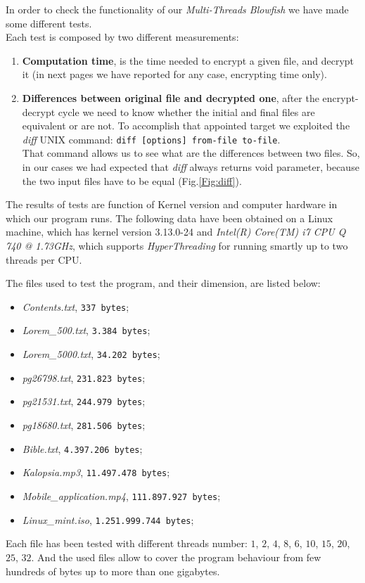 In order to check the functionality of our \textit{Multi-Threads Blowfish} we have made some different tests.\\
Each test is composed by two different measurements:
\begin{enumerate}
\item \textbf{Computation time}, is the time needed to encrypt a given file, and decrypt it (in next pages we have reported for any case, encrypting time only).
\item \textbf{Differences between original file and decrypted one}, after the encrypt-decrypt cycle we need to know whether the initial and final files are equivalent or are not. To accomplish that appointed  target we exploited the \textit{diff} UNIX command:
\texttt{diff [options] from-file to-file}.\\
That command allows us to see what are the differences between two files. So, in our cases we had expected that \textit{diff} always returns void parameter, because the two input files have to be equal (Fig.\ref{Fig:diff}). 

 \vspace{-5mm}

\end{enumerate}
The results of tests are function of Kernel version and computer hardware in which our program runs. The following data have been obtained on a Linux machine, which has kernel version 3.13.0-24 and \textit{Intel(R) Core(TM) i7 CPU Q 740  @ 1.73GHz}, which supports \textit{HyperThreading}  for running smartly up to two threads per CPU.

The files used to test the program, and their dimension, are listed below:
\vspace{-1mm}
\begin{itemize}
\item \textit{Contents.txt}, \texttt{337 bytes};
\item \textit{Lorem\_500.txt}, \texttt{3.384 bytes};
\item \textit{Lorem\_5000.txt}, \texttt{34.202 bytes};
\item \textit{pg26798.txt}, \texttt{231.823 bytes};
\item \textit{pg21531.txt}, \texttt{244.979 bytes};
\item \textit{pg18680.txt}, \texttt{281.506 bytes};
\item \textit{Bible.txt}, \texttt{4.397.206 bytes};
\item \textit{Kalopsia.mp3}, \texttt{11.497.478 bytes};
\item \textit{Mobile\_application.mp4}, \texttt{111.897.927 bytes};
\item \textit{Linux\_mint.iso}, \texttt{1.251.999.744 bytes};
\end{itemize}
\vspace{-1mm}
Each file has been tested with different threads number: $1$, $2$, $4$, $8$, $6$, $10$, $15$, $20$, $25$, $32$. And the used files allow to cover the program behaviour from few hundreds of bytes up to more than one gigabytes.

